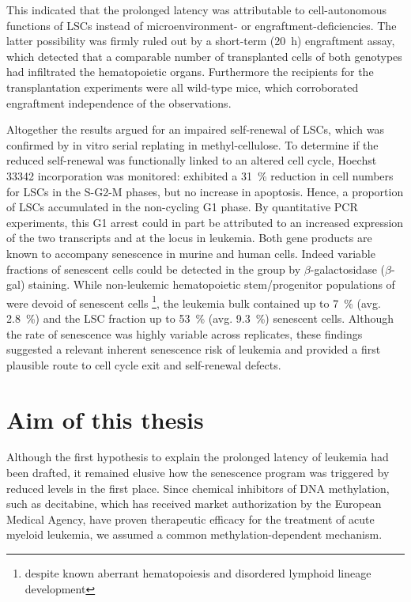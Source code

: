 This indicated that the prolonged latency was attributable to cell-autonomous functions of LSCs instead of microenvironment- or engraftment-deficiencies. The latter possibility was firmly ruled out by a short-term (\SI{20}{\hour}) engraftment assay, which detected that a comparable number of transplanted cells of both genotypes had infiltrated the hematopoietic organs. Furthermore the recipients for the transplantation experiments were all wild-type mice, which corroborated engraftment independence of the observations. 

Altogether the results argued for an impaired self-renewal of LSCs, which was confirmed by in vitro serial replating in methyl-cellulose. To determine if the reduced self-renewal was functionally linked to an altered cell cycle, Hoechst\,\num{33342} incorporation was monitored: \dnmtchip \mllafnine exhibited a \SI{31}{\percent} reduction in cell numbers for LSCs in the S-G2-M phases, but no increase in apoptosis. Hence, a proportion of \dnmtchip LSCs accumulated in the non-cycling G1 phase. By quantitative PCR experiments, this G1 arrest could in part be attributed to an increased expression of the two transcripts  and  at the  locus in \dnmtchip leukemia. Both gene products are known to accompany senescence in murine and human cells. Indeed variable fractions of senescent cells could be detected in the \dnmtchip group by \ensuremath{\beta}-galactosidase (\ensuremath{\beta}-gal) staining. While non-leukemic hematopoietic stem/progenitor populations of \dnmtchip were devoid of senescent cells \footnote{despite known aberrant hematopoiesis and disordered lymphoid lineage development\cite{Broeske2009}}, the leukemia bulk contained up to \SI{7}{\percent} (avg. \SI{2.8}{\percent}) and the LSC fraction up to \SI{53}{\percent} (avg. \SI{9.3}{\percent}) senescent cells. Although the rate of senescence was highly variable across replicates, these findings suggested a relevant inherent senescence risk of \dnmtchip \mllafnine leukemia and provided a first plausible route to cell cycle exit and self-renewal defects. 

\section{Aim of this thesis}
\label{chap:i:project:aim}

Although the first hypothesis to explain the prolonged latency of \dnmtchip \mllafnine leukemia had been drafted, it remained elusive how the senescence program was triggered by reduced  levels in the first place. Since chemical inhibitors of DNA methylation, such as decitabine, which has received market authorization by the European Medical Agency, have proven therapeutic efficacy for the treatment of acute myeloid leukemia\cite{Stresemann2006,Hollenbach2010}, we assumed a common methylation-dependent mechanism.

